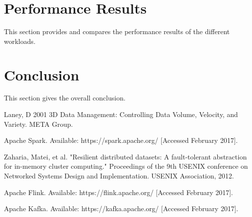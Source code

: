 \documentclass[]{article}
\begin{document}
\section{Performance Results}

This section provides and compares the performance results of the different workloads.

\section{Conclusion}
This section gives the overall conclusion.


\begin{thebibliography}{[MT1]}
%
Laney, D 2001 3D Data Management: Controlling Data Volume, Velocity, and Variety. META Group.

Apache Spark. Available: https://spark.apache.org/ [Accessed February 2017].

Zaharia, Matei, et al. "Resilient distributed datasets: A fault-tolerant abstraction for in-memory cluster computing." Proceedings of the 9th USENIX conference on Networked Systems Design and Implementation. USENIX Association, 2012.

Apache Flink. Available: https://flink.apache.org/ [Accessed February 2017].

Apache Kafka. Available: https://kafka.apache.org/ [Accessed February 2017].


%
\end{thebibliography}
\end{document}
